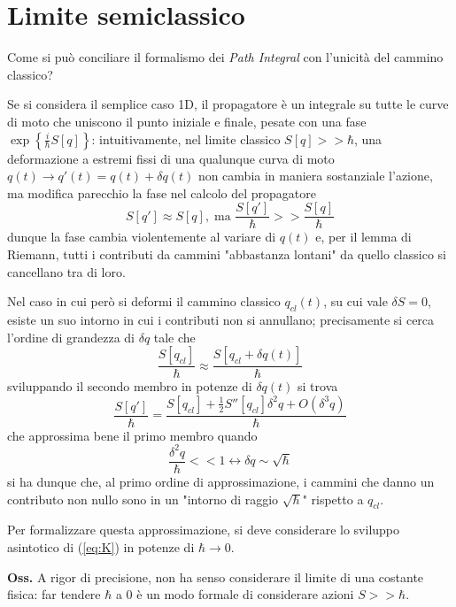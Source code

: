 \newpage
\section{Limite semiclassico}
Come si può conciliare il formalismo dei \textit{Path Integral}	con l'unicità del cammino classico?

Se si considera il semplice caso 1D, il propagatore è un integrale su tutte le curve di moto che
uniscono il punto iniziale e finale, pesate con una fase $\exp\left\{\frac{i}{\hbar}S[q]\right\}$:
intuitivamente, nel limite classico $S[q]>>\hbar$, una deformazione a estremi fissi di una qualunque
curva di moto $q(t)\rightarrow q'(t)=q(t)+\delta q(t)$ non cambia in maniera sostanziale
l'azione, ma modifica parecchio la fase nel calcolo del propagatore
$$S[q']\approx S[q],\;\text{ma }\frac{S[q']}{\hbar}>>\frac{S[q]}{\hbar}$$
dunque la fase cambia violentemente al variare di $q(t)$ e, per il lemma di Riemann, tutti i
contributi da cammini "abbastanza lontani" da quello classico si cancellano tra di loro.

Nel caso in cui però si deformi il cammino classico $q_{cl}(t)$, su cui vale $\delta S=0$,
esiste un suo intorno in cui i contributi non si annullano;
precisamente si cerca l'ordine di grandezza di $\delta q$ tale che
$$\frac{S[q_{cl}]}{\hbar}\approx\frac{S[q_{cl}+\delta q(t)]}{\hbar}$$
sviluppando il secondo membro in potenze di $\delta q(t)$ si trova
$$ \frac{S[q']}{\hbar} = \frac{S[q_{cl}] + \frac{1}{2}S''[q_{cl}]\delta^2q + O(\delta^3q)}{\hbar}$$
che approssima bene il primo membro quando
$$\frac{\delta^2q}{\hbar}<<1 \leftrightarrow \delta q\sim\sqrt{\hbar}$$
si ha dunque che, al primo ordine di approssimazione, i cammini che danno un contributo non nullo
sono in un "intorno di raggio $\sqrt{\hbar}$" rispetto a $q_{cl}$.

Per formalizzare questa approssimazione, si deve considerare lo sviluppo asintotico di (\ref{eq:K}) in
potenze di $\hbar\rightarrow 0$.

\textbf{Oss.} A rigor di precisione, non ha senso considerare il limite di una costante fisica: far
tendere $\hbar$ a 0 è un modo formale di considerare azioni $S>>\hbar$.

